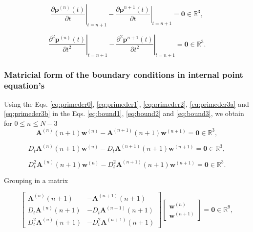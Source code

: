 \begin{equation}\label{eq:bound2}
\left.\frac{\partial\mathbf{p}^{(n)}(t)}{\partial t}\right|_{t=n+1}
-
\left.\frac{\partial\mathbf{p}^{n+1}(t)}{\partial t}\right|_{t=n+1}
=\mathbf{0}\in \mathbb{R}^{3},
\end{equation}

\begin{equation}\label{eq:bound3}
\left.\frac{\partial^{2}\mathbf{p}^{(n)}(t)}{\partial t^{2}}\right|_{t=n+1}
-
\left.\frac{\partial^{2}\mathbf{p}^{n+1}(t)}{\partial t^{2}}\right|_{t=n+1}
=\mathbf{0}\in \mathbb{R}^{3}.
\end{equation}

\subsubsection{Matricial form of the boundary conditions in internal point equation's}
Using %
the Eqs. \ref{eq:primeder0}, \ref{eq:primeder1}, \ref{eq:primeder2}, \ref{eq:primeder3a} and \ref{eq:primeder3b} in 
the Eqs. \ref{eq:bound1}, \ref{eq:bound2} and \ref{eq:bound3},
we obtain for $0 \leq n\leq N-3$
\begin{equation}
 \mathbf{A}^{(n)}(n+1) \mathbf{w}^{(n)} - \mathbf{A}^{(n+1)}(n+1) \mathbf{w}^{(n+1)} 
 =
 \mathbf{0} \in \mathbb{R}^{3},
\end{equation}

\begin{equation}
D_{t}\mathbf{A}^{(n)}(n+1)
\mathbf{w}^{(n)}
-
D_{t}\mathbf{A}^{(n+1)}(n+1)
\mathbf{w}^{(n+1)}
=\mathbf{0}\in \mathbb{R}^{3},
\end{equation}


\begin{equation}
D_{t}^{2}\mathbf{A}^{(n)}(n+1)
\mathbf{w}^{(n)}
-
D_{t}^{2}\mathbf{A}^{(n+1)}(n+1)
\mathbf{w}^{(n+1)}
=\mathbf{0}\in \mathbb{R}^{3}.
\end{equation}

Grouping in a matrix

\begin{equation}
\begin{bmatrix}
\mathbf{A}^{(n)}(n+1) & -\mathbf{A}^{(n+1)}(n+1)\\
D_{t}\mathbf{A}^{(n)}(n+1) & -D_{t}\mathbf{A}^{(n+1)}(n+1)\\
D_{t}^{2}\mathbf{A}^{(n)}(n+1) & -D_{t}^{2}\mathbf{A}^{(n+1)}(n+1)
\end{bmatrix}
\begin{bmatrix}
\mathbf{w}^{(n)}\\
\mathbf{w}^{(n+1)}
\end{bmatrix}
=\mathbf{0}\in \mathbb{R}^{9},
\end{equation}



